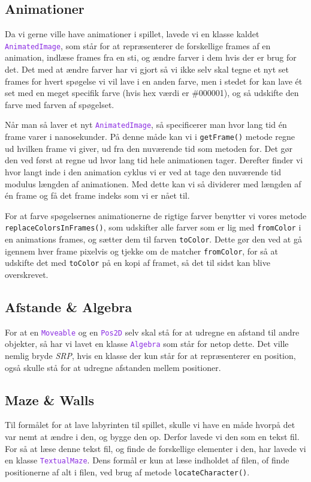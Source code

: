 \documentclass{article}
\newcommand{\code}[1]{\small\texttt{#1}}
\newcommand{\class}[1]{\textcolor{BlueViolet}{\small\texttt{#1}}}
\theoremstyle{mytheoremstyle}
\theoremstyle{mytheoremstyle}
\theoremstyle{myproblemstyle}
\begin{document}

\subsection{Animationer}\label{sub:Animationer} %
Da vi gerne ville have animationer i spillet, lavede vi en klasse kaldet
\class{AnimatedImage}, som står for at repræsenterer de forskellige frames af en
animation, indlæse frames fra en sti, og ændre farver i dem hvis der er brug for
det. Det med at ændre farver har vi gjort så vi ikke selv skal tegne et nyt set
frames for hvert spøgelse vi vil lave i en anden farve, men i stedet for kan
lave ét set med en meget specifik farve (hvis hex værdi er \#000001), og så
udskifte den farve med farven af spøgelset.

Når man så laver et nyt \class{AnimatedImage}, så specificerer man hvor lang tid
én frame varer i nanosekunder. På denne måde kan vi i \code{getFrame()} metode
regne ud hvilken frame vi giver, ud fra den nuværende tid som metoden for. Det
gør den ved først at regne ud hvor lang tid hele animationen tager. Derefter
finder vi hvor langt inde i den animation cyklus vi er ved at tage den
nuværende tid modulus længden af animationen. Med dette kan vi så dividerer med
længden af én frame og få det frame indeks som vi er nået til.

For at farve spøgelsernes animationerne de rigtige farver benytter vi vores
metode \code{replaceColorsInFrames()}, som udskifter alle farver som er lig med
\code{fromColor} i en animations frames, og sætter dem til farven
\code{toColor}. Dette gør den ved at gå igennem hver frame pixelvis og tjekke om
de matcher \code{fromColor}, for så at udskifte det med \code{toColor} på en
kopi af framet, så det til sidst kan blive overskrevet.

\subsection{Afstande \& Algebra}
For at en \class{Moveable} og en \class{Pos2D} selv skal stå for at udregne en
afstand til andre objekter, så har vi lavet en klasse \class{Algebra} som står
for netop dette. Det ville nemlig bryde \textit{SRP}, hvis en klasse der kun
står for at repræsenterer en position, også skulle stå for at udregne afstanden
mellem positioner.

\subsection{Maze \& Walls}
Til formålet for at lave labyrinten til spillet, skulle vi have en måde hvorpå
det var nemt at ændre i den, og bygge den op. Derfor lavede vi den som en tekst
fil. For så at læse denne tekst fil, og finde de forskellige elementer i den,
har lavede vi en klasse \class{TextualMaze}. Dens formål er kun at læse indholdet
af filen, of finde positionerne af alt i filen, ved brug af metode
\code{locateCharacter()}.
\end{document}
